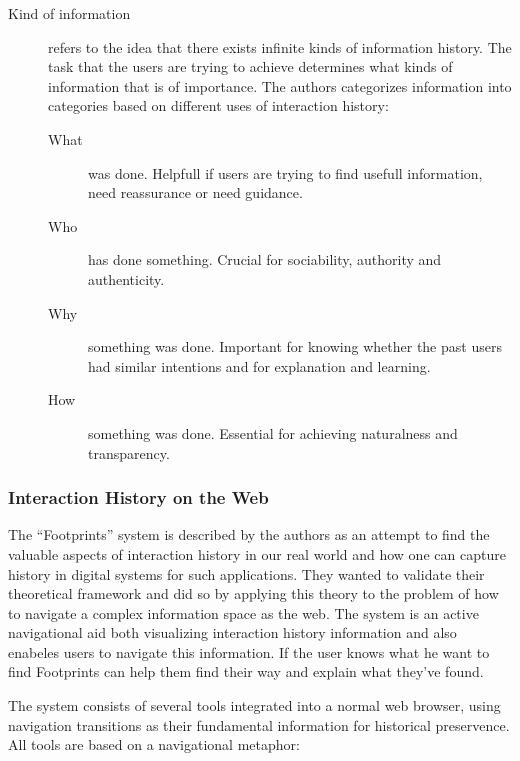 \documentclass[12pt,a4paper]{article}
\begin{document}
\begin{description}
  \item[Kind of information] refers to the idea that there exists infinite
    kinds of information history. The task that the users are trying to
    achieve determines what kinds of information that is of importance. The
    authors categorizes information into categories based on different uses of
    interaction history:
  \begin{description}
    \item[What] was done. Helpfull if users are trying to find usefull
      information, need reassurance or need guidance.
    \item[Who] has done something. Crucial for sociability, authority and
      authenticity. 
    \item[Why] something was done. Important for knowing whether the past users
      had similar intentions and for explanation and learning.
    \item[How] something was done. Essential for achieving naturalness and
      transparency.
  \end{description}
\end{description}

\subsubsection{Interaction History on the Web}

The ``Footprints'' system is described by the authors as an attempt to find
the valuable aspects of interaction history in our real world and how one can
capture history in digital systems for such applications. They wanted to
validate their theoretical framework and did so by applying this theory to the
problem of how to navigate a complex information space as the web. The system
is an active navigational aid both visualizing interaction history
information and also enabeles users to navigate this information. If the user
knows what he want to find Footprints can help them find their way and
explain what they've found.

The system consists of several tools integrated into a normal web browser,
using navigation transitions as their fundamental information for historical
preservence. All tools are based on a navigational metaphor:
\end{document}
